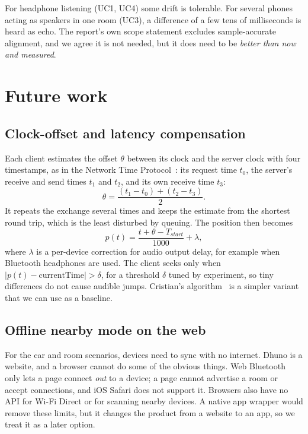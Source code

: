 \documentclass[11pt,a4paper]{article}
\begin{document}
For headphone listening (UC1, UC4) some drift is tolerable. For several phones acting as
speakers in one room (UC3), a difference of a few tens of milliseconds is heard as echo.
The report's own scope statement excludes sample-accurate alignment, and we agree it is not
needed, but it does need to be \emph{better than now and measured}.

\section{Future work}\label{sec:future}
\subsection{Clock-offset and latency compensation}
Each client estimates the offset $\theta$ between its clock and the server clock with four
timestamps, as in the Network Time Protocol~\cite{ntp}: its request time $t_0$, the server's receive and send times $t_1$ and $t_2$, and
its own receive time $t_3$:
\begin{equation}
  \theta = \frac{(t_1 - t_0) + (t_2 - t_3)}{2}.
\end{equation}
It repeats the exchange several times and keeps the estimate from the shortest round trip,
which is the least disturbed by queuing. The position then becomes
\begin{equation}
  p(t) = \frac{t + \theta - T_{start}}{1000} + \lambda,
\end{equation}
where $\lambda$ is a per-device correction for audio output delay, for example when
Bluetooth headphones are used. The client seeks only when $\left|p(t) - \text{currentTime}\right| > \delta$,
for a threshold $\delta$ tuned by experiment, so tiny differences do not cause audible jumps.
Cristian's algorithm~\cite{cristian} is a simpler variant that we can use as a baseline.

\subsection{Offline nearby mode on the web}\label{sec:nearby}
For the car and room scenarios, devices need to sync with no internet. Dhuno is a website,
and a browser cannot do some of the obvious things. Web Bluetooth only lets a page
connect \emph{out} to a device; a page cannot advertise a room or accept connections, and
iOS Safari does not support it. Browsers also have no API for Wi-Fi Direct or for scanning
nearby devices. A native app wrapper would remove these limits, but it changes the product
from a website to an app, so we treat it as a later option.
\end{document}
